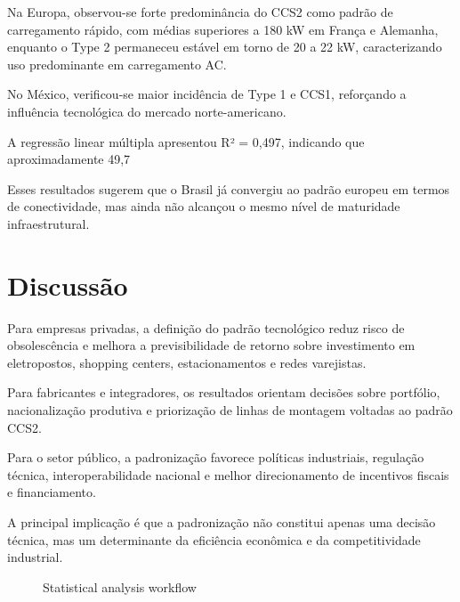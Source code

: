 \documentclass[12pt]{article}
\begin{document}
Na Europa, observou-se forte predominância do CCS2 como padrão de carregamento rápido, com médias superiores a 180 kW em França e Alemanha, enquanto o Type 2 permaneceu estável em torno de 20 a 22 kW, caracterizando uso predominante em carregamento AC. 

No México, verificou-se maior incidência de Type 1 e CCS1, reforçando a influência tecnológica do mercado norte-americano. 

A regressão linear múltipla apresentou R² = 0,497, indicando que aproximadamente 49,7%

Esses resultados sugerem que o Brasil já convergiu ao padrão europeu em termos de conectividade, mas ainda não alcançou o mesmo nível de maturidade infraestrutural.

\section{Discussão}
Para empresas privadas, a definição do padrão tecnológico reduz risco de obsolescência e melhora a previsibilidade de retorno sobre investimento em eletropostos, shopping centers, estacionamentos e redes varejistas. 

Para fabricantes e integradores, os resultados orientam decisões sobre portfólio, nacionalização produtiva e priorização de linhas de montagem voltadas ao padrão CCS2. 

Para o setor público, a padronização favorece políticas industriais, regulação técnica, interoperabilidade nacional e melhor direcionamento de incentivos fiscais e financiamento. 

A principal implicação é que a padronização não constitui apenas uma decisão técnica, mas um determinante da eficiência econômica e da competitividade industrial.


\begin{figure}[h]
\centering


\caption{Statistical analysis workflow}
\end{figure}
\end{document}
